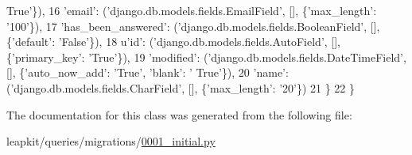 \begin{DoxyCode}
{      True'}\}),
16             \textcolor{stringliteral}{'email'}: (\textcolor{stringliteral}{'django.db.models.fields.EmailField'}, [], \{\textcolor{stringliteral}{'max\_length'}: \textcolor{stringliteral}{'100'}\}),
17             \textcolor{stringliteral}{'has\_been\_answered'}: (\textcolor{stringliteral}{'django.db.models.fields.BooleanField'}, [], \{\textcolor{stringliteral}{'default'}: \textcolor{stringliteral}{'False'}\}),
18             \textcolor{stringliteral}{u'id'}: (\textcolor{stringliteral}{'django.db.models.fields.AutoField'}, [], \{\textcolor{stringliteral}{'primary\_key'}: \textcolor{stringliteral}{'True'}\}),
19             \textcolor{stringliteral}{'modified'}: (\textcolor{stringliteral}{'django.db.models.fields.DateTimeField'}, [], \{\textcolor{stringliteral}{'auto\_now\_add'}: \textcolor{stringliteral}{'True'}, \textcolor{stringliteral}{'blank'}: \textcolor{stringliteral}{'
      True'}\}),
20             \textcolor{stringliteral}{'name'}: (\textcolor{stringliteral}{'django.db.models.fields.CharField'}, [], \{\textcolor{stringliteral}{'max\_length'}: \textcolor{stringliteral}{'20'}\})
21         \}
22     \}
\end{DoxyCode}


The documentation for this class was generated from the following file\-:\begin{DoxyCompactItemize}
\item 
leapkit/queries/migrations/\hyperlink{queries_2migrations_20001__initial_8py}{0001\-\_\-initial.\-py}\end{DoxyCompactItemize}
